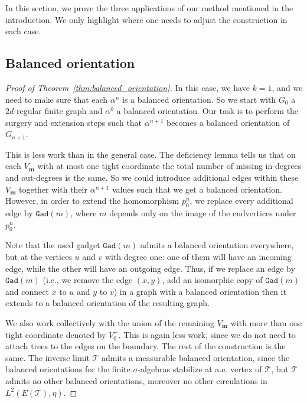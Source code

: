 \documentclass[10pt]{article}
\theoremstyle{plain}
\theoremstyle{remark}
\newcommand{\1}{\mathbbm{1}}
\newcommand{\mcT}{\mathcal{T}}
\numberwithin{equation}{section}
\begin{document}
In this section, we prove the three applications of our method mentioned in the introduction. We only highlight where one needs to adjust the construction in each case.

\subsection{Balanced orientation} \label{subsec:balanced_orientation}

\begin{proof}[Proof of Theorem~\ref{thm:balanced_orientation}]
In this case, we have $k=1$, and we need to make sure that each $\alpha^n$ is a balanced orientation. So we start with $G_0$ a $2d$-regular finite graph and $\alpha^0$ a balanced orientation. Our task is to perform the surgery and extension steps such that $\alpha^{n+1}$ becomes a balanced orientation of $G_{n+1}$. 

This is less work than in the general case. 
The deficiency lemma tells us that on each $V_\mathbf{m}$ with at most one tight coordinate the total number of missing in-degrees and out-degrees is the same. So we could introduce additional edges within these $V_\mathbf{m}$ together with their $\alpha^{n+1}$ values such that we get a balanced orientation. However, in order to extend the homomorphism $p_0^n$, we replace every additional edge by $\texttt{Gad}(m)$, where $m$ depends only on the image of the endvertices under $p_0^n$.

Note that the used gadget $\texttt{Gad}(m)$ admits a balanced orientation everywhere, but at the vertices $u$ and $v$ with degree one: one of them will have an incoming edge, while the other will have an outgoing edge. Thus, if we replace an edge by $\texttt{Gad}(m)$ (i.e., we remove the edge $(x,y)$, add an isomorphic copy of $\texttt{Gad}(m)$ and connect $x$ to $u$ and $y$ to $v$) in a graph with a balanced orientation then it extends to a balanced orientation of the resulting graph. 

We also work collectively with the union of the remaining $V_{\mathbf{m}}$ with more than one tight coordinate denoted by $V_0^+$. This is again less work, since we do not need to attach trees to the edges on the boundary. The rest of the construction is the same. The inverse limit $\mcT$ admits a measurable balanced orientation, since the balanced orientations for the finite $\sigma$-algebras stabilize at a.e. vertex of $\mcT$, but $\mcT$ admits no other balanced orientations, moreover no other circulations in $L^2(E(\mcT),\eta)$.
\end{proof}
\end{document}

